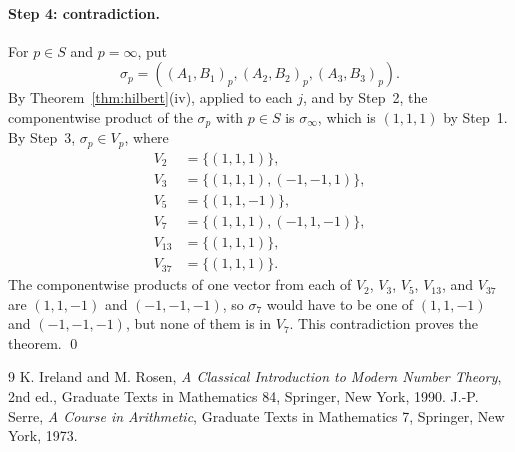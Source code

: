 \documentclass[11pt]{article}
\begin{document}
\paragraph{Step 4: contradiction.} For $p\in S$ and $p=\infty$, put \[\sigma_p=((A_{1},B_{1})_p,(A_{2},B_{2})_p,(A_{3},B_{3})_p).\] By Theorem~\ref{thm:hilbert}(iv), applied to each $j$, and by Step~2, the componentwise product of the $\sigma_p$ with $p\in S$ is $\sigma_\infty$, which is $(1,1,1)$ by Step~1. By Step~3, $\sigma_p\in V_p$, where
\begin{align*}
V_{2}&=\{(1,1,1)\},\\
V_{3}&=\{(1,1,1),(-1,-1,1)\},\\
V_{5}&=\{(1,1,-1)\},\\
V_{7}&=\{(1,1,1),(-1,1,-1)\},\\
V_{13}&=\{(1,1,1)\},\\
V_{37}&=\{(1,1,1)\}.
\end{align*}The componentwise products of one vector from each of $V_{2}$, $V_{3}$, $V_{5}$, $V_{13}$, and $V_{37}$ are $(1,1,-1)$ and $(-1,-1,-1)$, so $\sigma_{7}$ would have to be one of $(1,1,-1)$ and $(-1,-1,-1)$, but none of them is in $V_{7}$. This contradiction proves the theorem.
\qed

\begin{thebibliography}{9}
 K. Ireland and M. Rosen, \emph{A Classical Introduction to Modern Number Theory}, 2nd ed., Graduate Texts in Mathematics 84, Springer, New York, 1990.
 J.-P. Serre, \emph{A Course in Arithmetic}, Graduate Texts in Mathematics 7, Springer, New York, 1973.
\end{thebibliography}
\end{document}
